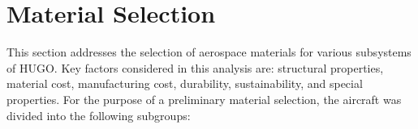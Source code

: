 \section{Material Selection}
\label{sec:Material_Selection}

This section addresses the selection of aerospace materials for various subsystems of HUGO. Key factors considered in this analysis are: structural properties, material cost, manufacturing cost, durability, sustainability, and special properties. For the purpose of a preliminary material selection, the aircraft was divided into the following subgroups:



